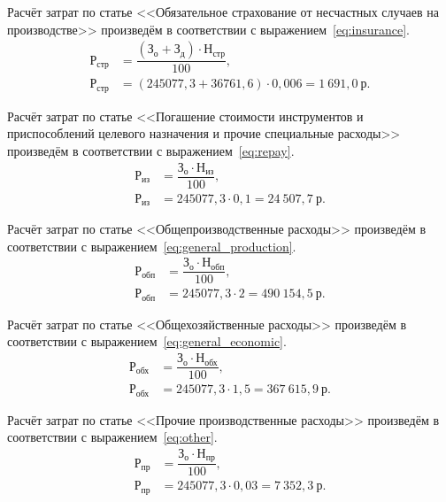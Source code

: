 Расчёт затрат по статье <<Обязательное страхование от несчастных случаев
на производстве>> произведём в соответствии с выражением~\ref{eq:insurance}.
\begin{align}
  \label{eq:insurance}
  \text{Р}_{\text{стр}} &= \dfrac{(\text{З}_{\text{о}} + \text{З}_{\text{д}}) \cdot
    \text{Н}_{\text{стр}}}{100}, \\
  \text{Р}_{\text{стр}} &= (245077{,}3 + 36761{,}6) \cdot 0{,}006 =
    1~691{,}0 \: \text{р.} \nonumber
\end{align}

Расчёт затрат по статье <<Погашение стоимости инструментов и приспособлений
целевого назначения и прочие специальные расходы>>
произведём в соответствии с выражением~\ref{eq:repay}.
\begin{align}
  \label{eq:repay}
  \text{Р}_{\text{из}} &= \dfrac{\text{З}_{\text{о}} \cdot
    \text{Н}_{\text{из}}}{100}, \\
  \text{Р}_{\text{из}} &= 245077{,}3 \cdot 0{,}1 =
    24~507{,}7 \: \text{р.} \nonumber
\end{align}

Расчёт затрат по статье <<Общепроизводственные расходы>>
произведём в соответствии с выражением~\ref{eq:general_production}.
\begin{align}
  \label{eq:general_production}
  \text{Р}_{\text{обп}} &= \dfrac{\text{З}_{\text{о}} \cdot
    \text{Н}_{\text{обп}}}{100}, \\
  \text{Р}_{\text{обп}} &= 245077{,}3 \cdot 2 =
    490~154{,}5 \: \text{р.} \nonumber
\end{align}

Расчёт затрат по статье <<Общехозяйственные расходы>>
произведём в соответствии с выражением~\ref{eq:general_economic}.
\begin{align}
  \label{eq:general_economic}
  \text{Р}_{\text{обх}} &= \dfrac{\text{З}_{\text{о}} \cdot
    \text{Н}_{\text{обх}}}{100}, \\
  \text{Р}_{\text{обх}} &= 245077{,}3 \cdot 1{,}5 =
    367~615{,}9 \: \text{р.} \nonumber
\end{align}

Расчёт затрат по статье <<Прочие производственные расходы>>
произведём в соответствии с выражением~\ref{eq:other}.
\begin{align}
  \label{eq:other}
  \text{Р}_{\text{пр}} &= \dfrac{\text{З}_{\text{о}} \cdot
    \text{Н}_{\text{пр}}}{100}, \\
  \text{Р}_{\text{пр}} &= 245077{,}3 \cdot 0{,}03 =
    7~352{,}3 \: \text{р.} \nonumber
\end{align}


